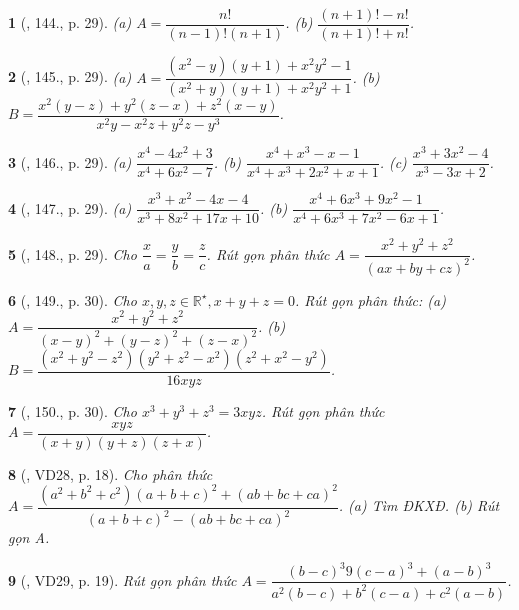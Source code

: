 \documentclass{article}
\newtheorem{baitoan}{}
\begin{document}
\begin{baitoan}[\cite{Tuyen_Toan_8}, 144., p. 29]
	(a) $A = \dfrac{n!}{(n - 1)!(n + 1)}$. (b) $\dfrac{(n + 1)! - n!}{(n + 1)! + n!}$.	
\end{baitoan}

\begin{baitoan}[\cite{Tuyen_Toan_8}, 145., p. 29]
	(a) $A = \dfrac{(x^2 - y)(y + 1) + x^2y^2 - 1}{(x^2 + y)(y + 1) + x^2y^2 + 1}$. (b) $B = \dfrac{x^2(y - z) + y^2(z - x) + z^2(x - y)}{x^2y - x^2z + y^2z - y^3}$.	
\end{baitoan}

\begin{baitoan}[\cite{Tuyen_Toan_8}, 146., p. 29]
	(a) $\dfrac{x^4 - 4x^2 + 3}{x^4 + 6x^2 - 7}$. (b) $\dfrac{x^4 + x^3 - x - 1}{x^4 + x^3 + 2x^2 + x + 1}$. (c) $\dfrac{x^3 + 3x^2 - 4}{x^3 - 3x + 2}$.	
\end{baitoan}

\begin{baitoan}[\cite{Tuyen_Toan_8}, 147., p. 29]
	(a) $\dfrac{x^3 + x^2 - 4x - 4}{x^3 + 8x^2 + 17x + 10}$. (b) $\dfrac{x^4 + 6x^3 + 9x^2 - 1}{x^4 + 6x^3 + 7x^2 - 6x + 1}$.	
\end{baitoan}

\begin{baitoan}[\cite{Tuyen_Toan_8}, 148., p. 29]
	Cho $\dfrac{x}{a} = \dfrac{y}{b} = \dfrac{z}{c}$. Rút gọn phân thức $A = \dfrac{x^2 + y^2 + z^2}{(ax + by + cz)^2}$.
\end{baitoan}

\begin{baitoan}[\cite{Tuyen_Toan_8}, 149., p. 30]
	Cho $x,y,z\in\mathbb{R}^\star,x + y + z = 0$. Rút gọn phân thức: (a) $A = \dfrac{x^2 + y^2 + z^2}{(x - y)^2 + (y - z)^2 + (z - x)^2}$. (b) $B = \dfrac{(x^2 + y^2 - z^2)(y^2 + z^2 - x^2)(z^2 + x^2 - y^2)}{16xyz}$.	
\end{baitoan}

\begin{baitoan}[\cite{Tuyen_Toan_8}, 150., p. 30]
	Cho $x^3 + y^3 + z^3 = 3xyz$. Rút gọn phân thức $A = \dfrac{xyz}{(x + y)(y + z)(z + x)}$.
\end{baitoan}

\begin{baitoan}[\cite{Binh_Toan_8_tap_1}, VD28, p. 18]
	Cho phân thức $A = \dfrac{(a^2 + b^2 + c^2)(a + b + c)^2 + (ab + bc + ca)^2}{(a + b + c)^2 - (ab + bc + ca)^2}$. (a) Tìm {\rm ĐKXĐ}. (b) Rút gọn A.
\end{baitoan}

\begin{baitoan}[\cite{Binh_Toan_8_tap_1}, VD29, p. 19]
	Rút gọn phân thức $A = \dfrac{(b - c)^3 9 (c - a)^3 + (a - b)^3}{a^2(b - c) + b^2(c - a) + c^2(a - b)}$.
\end{baitoan}
\end{document}
